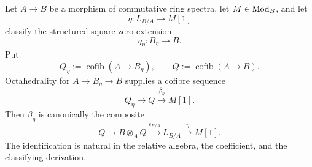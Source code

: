 \begin{lemma}
\label{lem:square-zero-boundary-hurewicz}
Let \(A\to B\) be a morphism of commutative ring spectra, let
\(M\in\operatorname{Mod}_B\), and let
\[
    \eta:L_{B/A}\longrightarrow M[1]
\]
classify the structured square-zero extension
\[
    q_\eta:B_\eta\longrightarrow B.
\]
Put
\[
    Q_\eta:=\operatorname{cofib}(A\to B_\eta),
    \qquad
    Q:=\operatorname{cofib}(A\to B).
\]
Octahedrality for
\(A\to B_\eta\to B\) supplies a cofibre sequence
\[
    Q_\eta
    \longrightarrow
    Q
    \xrightarrow{\beta_\eta}
    M[1].
\]
Then \(\beta_\eta\) is canonically the composite
\[
    Q
    \longrightarrow
    B\otimes_AQ
    \xrightarrow{\epsilon_{B/A}}
    L_{B/A}
    \xrightarrow{\eta}
    M[1].
\]
The identification is natural in the relative algebra, the coefficient, and
the classifying derivation.
\end{lemma}

